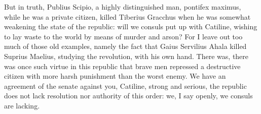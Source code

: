 {  But in truth, Publius Scipio, a highly distinguished man, pontifex maximus, while he was a private citizen, killed Tiberius Gracchus when he was somewhat weakening the state of the republic: will we consuls put up with Catiline, wishing to lay waste to the world by means of murder and arson? For I leave out too much of those old examples, namely the fact that Gaius Servilius Ahala killed Suprius Maelius, studying the revolution, with his own hand. There was, there was once such virtue in this republic that brave men repressed a destructive citizen with more harsh punishment than the worst enemy. We have an agreement of the senate against you, Catiline, strong and serious, the republic does not lack resolution nor authority of this order: we, I say openly, we consuls are lacking.
}
